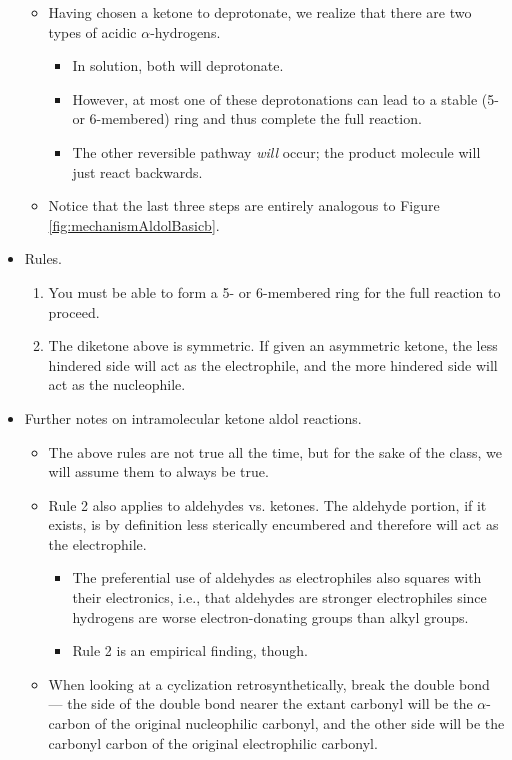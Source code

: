 \documentclass[../notes.tex]{subfiles}
\begin{document}
\begin{itemize}
\begin{itemize}
        \item Having chosen a ketone to deprotonate, we realize that there are two types of acidic $\alpha$-hydrogens.
        \begin{itemize}
            \item In solution, both will deprotonate.
            \item However, at most one of these deprotonations can lead to a stable (5- or 6-membered) ring and thus complete the full reaction.
            \item The other reversible pathway \emph{will} occur; the product molecule will just react backwards.
        \end{itemize}
        \item Notice that the last three steps are entirely analogous to Figure \ref{fig:mechanismAldolBasicb}.
    \end{itemize}
    \item Rules.
    \begin{enumerate}
        \item You must be able to form a 5- or 6-membered ring for the full reaction to proceed.
        \item The diketone above is symmetric. If given an asymmetric ketone, the less hindered side will act as the electrophile, and the more hindered side will act as the nucleophile.
    \end{enumerate}
    \item Further notes on intramolecular ketone aldol reactions.
    \begin{itemize}
        \item The above rules are not true all the time, but for the sake of the class, we will assume them to always be true.
        \item Rule 2 also applies to aldehydes vs. ketones. The aldehyde portion, if it exists, is by definition less sterically encumbered and therefore will act as the electrophile.
        \begin{itemize}
            \item The preferential use of aldehydes as electrophiles also squares with their electronics, i.e., that aldehydes are stronger electrophiles since hydrogens are worse electron-donating groups than alkyl groups.
            \item Rule 2 is an empirical finding, though.
        \end{itemize}
        \item When looking at a cyclization retrosynthetically, break the double bond --- the side of the double bond nearer the extant carbonyl will be the $\alpha$-carbon of the original nucleophilic carbonyl, and the other side will be the carbonyl carbon of the original electrophilic carbonyl.

\end{itemize}
\end{itemize}
\end{document}
